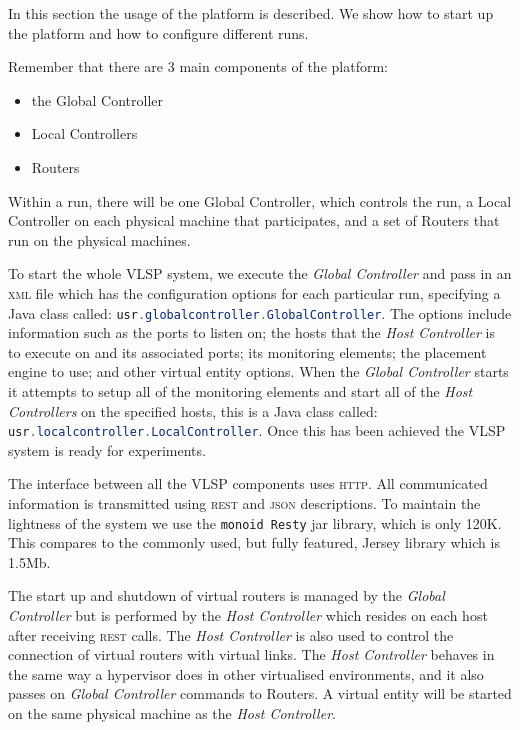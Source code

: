 
In this section the usage of the platform is described.  We show how
to start up the platform and how to configure different runs.

Remember that there are 3 main components of the platform:

\begin{itemize}
\item the Global Controller
\item Local Controllers
\item Routers
\end{itemize}

\noindent Within a run, there will be one Global Controller, which controls the
run, a Local Controller on each physical machine that participates,
and a set of Routers that run on the physical machines.

To start the whole VLSP system, we execute the \emph{Global Controller} and pass in an \textsc{xml} file which has the configuration options
for each particular run, specifying
 a Java class
called:  \lstinline[language=Java]$usr.globalcontroller.GlobalController$.
The options include information such as the
ports to listen on; the hosts that the \emph{Host Controller} is to execute
on and its associated ports; its monitoring elements; the placement engine to use; and other
virtual entity options.  When the \emph{Global
Controller} starts it attempts to setup all of the monitoring elements
and start all of the \emph{Host Controllers} on
the specified hosts, this  is a Java class
called:  \lstinline[language=Java]$usr.localcontroller.LocalController$.  Once
this has been achieved the VLSP system is ready for experiments.

The interface between all the VLSP components uses \textsc{http}.
All communicated information is transmitted using
\textsc{rest} and \textsc{json} descriptions. To maintain the
lightness of the system we use the \texttt{monoid Resty} jar library,
which is only 120K.  This compares to the commonly used, but fully
featured, Jersey library which is 1.5Mb.

The start up and shutdown of virtual routers is managed by the \emph{Global
Controller} but is performed by the \emph{Host Controller} which
resides on each host after receiving \textsc{rest} calls.
The \emph{Host Controller} is also
used to control
the connection of virtual routers with virtual links.
The \emph{Host Controller}  behaves in the same way a hypervisor does
in other virtualised environments, and it also passes on \emph{Global
Controller} commands to Routers.
A virtual entity will be started on the same physical machine as the
\emph{Host Controller}.




